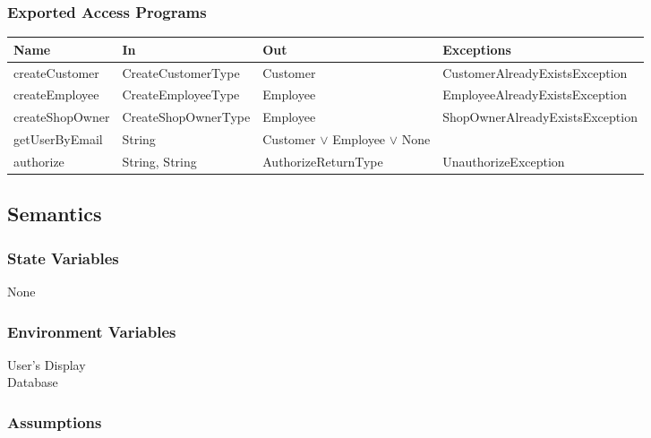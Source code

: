 \documentclass[12pt, titlepage]{article}
\begin{document}
\subsubsection{Exported Access Programs}

\begin{center}
	\begin{adjustbox}{width=\textwidth}
		\begin{tabular}{llll}
			\hline
			\textbf{Name}   & \textbf{In}         & \textbf{Out}                         & \textbf{Exceptions}             \\
			\hline
			createCustomer  & CreateCustomerType  & Customer                             & CustomerAlreadyExistsException  \\
			createEmployee  & CreateEmployeeType  & Employee                             & EmployeeAlreadyExistsException  \\
			createShopOwner & CreateShopOwnerType & Employee                             & ShopOwnerAlreadyExistsException \\
			getUserByEmail  & String              & Customer $\lor$ Employee $\lor$ None & ~                               \\
			authorize       & String, String      & AuthorizeReturnType                  & UnauthorizeException            \\
			\hline
		\end{tabular}
	\end{adjustbox}
\end{center}

\subsection{Semantics}

\subsubsection{State Variables}

None

\subsubsection{Environment Variables}

User's Display \\ Database

\subsubsection{Assumptions}
\end{document}
